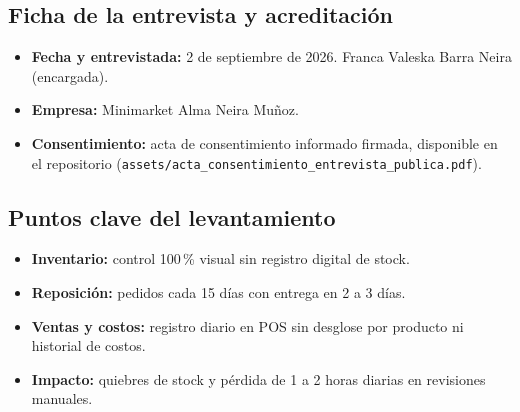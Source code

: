 \documentclass[10pt,a4paper]{article}
\begin{document}
\subsection*{Ficha de la entrevista y acreditación}

\begin{itemize}
    \item \textbf{Fecha y entrevistada:} 2 de septiembre de 2026. Franca Valeska Barra Neira (encargada).
    \item \textbf{Empresa:} Minimarket Alma Neira Muñoz.
    \item \textbf{Consentimiento:} acta de consentimiento informado firmada, disponible en el repositorio (\texttt{assets/acta\_consentimiento\_entrevista\_publica.pdf}).
\end{itemize}

\subsection*{Puntos clave del levantamiento}

\begin{itemize}
    \item \textbf{Inventario:} control 100\,\% visual sin registro digital de stock.
    \item \textbf{Reposición:} pedidos cada 15 días con entrega en 2 a 3 días.
    \item \textbf{Ventas y costos:} registro diario en POS sin desglose por producto ni historial de costos.
    \item \textbf{Impacto:} quiebres de stock y pérdida de 1 a 2 horas diarias en revisiones manuales.
\end{itemize}
\end{document}
